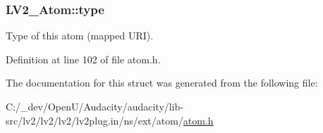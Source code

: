 \subsubsection[{\texorpdfstring{type}{type}}]{ L\+V2\+\_\+\+Atom\+::type}\hypertarget{struct_l_v2___atom_a5d13f0da49ed0ad1102b651220d930cb}{}\label{struct_l_v2___atom_a5d13f0da49ed0ad1102b651220d930cb}
Type of this atom (mapped U\+RI). 

Definition at line 102 of file atom.\+h.



The documentation for this struct was generated from the following file\+:\begin{DoxyCompactItemize}
\item 
C\+:/\+\_\+dev/\+Open\+U/\+Audacity/audacity/lib-\/src/lv2/lv2/lv2/lv2plug.\+in/ns/ext/atom/\hyperlink{atom_8h}{atom.\+h}\end{DoxyCompactItemize}
